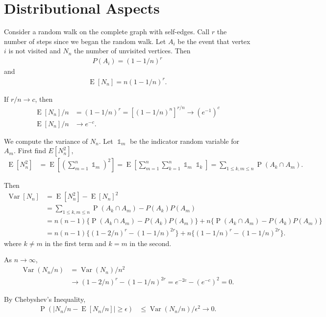 \documentclass[12pt]{article}
\theoremstyle{definition}
\DeclareMathOperator{\E}{\mathrm{E}}		     %
\DeclareMathOperator{\Var}{\mathrm{Var}}         %
\DeclareMathOperator{\I}{\mathbb{1}}         %
\DeclareMathOperator{\pr}{\mathrm{P}}		     %
\begin{document}
\section{Distributional Aspects}
\cite{Du11}
Consider a random walk on the complete graph with self-edges.
Call $r$ the number of steps since we began the random walk.
Let $A_i$ be the event that vertex $i$ is not visited and
$N_n$ the number of unvisited vertices.
Then
\begin{align}
P(A_i) = (1-1/n)^r \nonumber
\end{align}
and
\begin{align}
\E[N_n] = n(1-1/n)^r. \nonumber
\end{align}

If $r/n \rightarrow c$, then
\begin{align}
\E[N_n]/n &= (1-1/n)^r = [(1-1/n)^n]^{r/n} \rightarrow (e^{-1})^c \nonumber \\
\E[N_n]/n &\rightarrow e^{-c}. \nonumber
\end{align}

We compute the variance of $N_n$.
Let $\I_m$ be the indicator random variable for $A_m$.
First find $E[N_n^2]$,
\begin{align}
\E[N_n^2] &= \E \left[ \left(\sum_{m=1}^n \I_m \right) ^2 \right] =
\E \left[ \sum_{m=1}^n \sum_{k=1}^n \I_m \I_k \right] =
\sum_{1 \leq k, m \leq n} \pr(A_k \cap A_m). \nonumber
\end{align}

Then
\begin{align}
\Var[N_n] &= \E[N_n^2] - \E[N_n]^2 \nonumber \\
&= \sum_{1 \leq k, m \leq n} \pr(A_k \cap A_m) - P(A_k)P(A_m) \nonumber \\
&= n(n-1) \{ \pr(A_k \cap A_m) - P(A_k)P(A_m) \} + 
n \{ \pr(A_k \cap A_m) - P(A_k)P(A_m) \} \nonumber \\
&= n(n-1) \{ (1-2/n)^r - (1-1/n)^{2r} \} + 
n \{ (1-1/n)^r  - (1-1/n)^{2r} \}. \nonumber
\end{align}
where $k\neq m$ in the first term and $k=m$ in the second.

As $n \rightarrow \infty$,
\begin{align}
\Var(N_n/n) &= \Var(N_n) / n^2 \nonumber\\
&\rightarrow (1-2/n)^r - (1-1/n)^{2r} = e^{-2c} - (e^{-c})^2 = 0. \nonumber
\end{align}

By Chebyshev's Inequality,
\begin{align}
\pr \left( |N_n/n - \E[N_n/n]| \geq \epsilon \right) &\leq \Var(N_n/n) / \epsilon^2
\rightarrow 0. \nonumber
\end{align}
\end{document}
